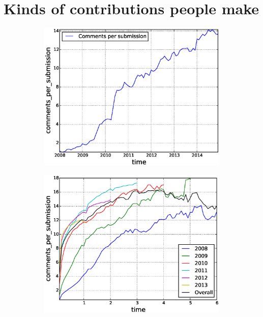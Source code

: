 \section{Kinds of contributions people make}

\begin{figure}[!tb]
\centering
\begin{subfigure}{.49\textwidth}\includegraphics[scale=0.4]{./images/comments_per_submissions_over_time_total.eps}\caption{}\end{subfigure}
\begin{subfigure}{.49\textwidth}\includegraphics[scale=0.4]{./images/comments_per_submissions_cohorts.eps}\caption{}\end{subfigure}

\end{figure}
